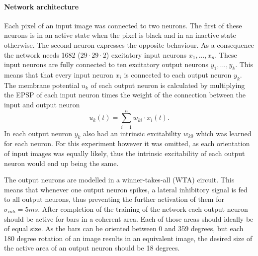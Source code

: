 \paragraph{Network architecture}
Each pixel of an input image was connected to two neurons. The first of these neurons is in an active state when the pixel is black and in an inactive state otherwise. The second neuron expresses the opposite behaviour. As a consequence the network needs 1682 ($29 \cdot 29 \cdot 2$) excitatory input neurons $x_1,...,x_n$. These input neurons are fully connected to ten excitatory output neurons $y_1,...,y_k$. This means that that every input neuron $x_i$ is connected to each output neuron $y_k$. The membrane potential $u_k$ of each output neuron is calculated by multiplying the EPSP of each input neuron times the weight of the connection between the input and output neuron 
\begin{equation}
\label{eqn:uk}
u_k(t) = \sum_{i=1}^n w_{ki} \cdot x_i(t).
\end{equation}
In \citet{nessler} each output neuron $y_k$ also had an intrinsic excitability $w_{k0}$ which was learned for each neuron. For this experiment however it was omitted, as each orientation of input images was equally likely, thus the intrinsic excitability of each output neuron would end up being the same.

The output neurons are modelled in a winner-takes-all (WTA) circuit. This means that whenever one output neuron spikes, a lateral inhibitory signal is fed to all output neurons, thus preventing the further activation of them for $\sigma_{inh} = 5 ms$. After completion of the training of the network each output neuron should be active for bars in a coherent area. Each of those areas should ideally be of equal size. As the bars can be oriented between 0 and 359 degrees, but each 180 degree rotation of an image results in an equivalent image, the desired size of the active area of an output neuron should be 18 degrees.


